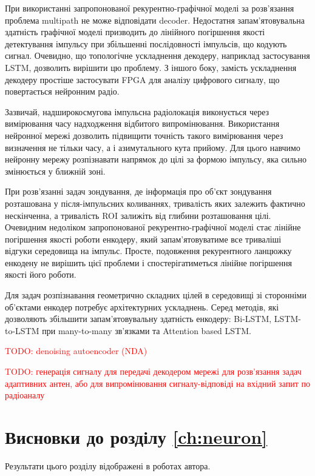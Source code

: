 При використанні запропонованої рекурентно-графічної моделі за розв'язання 
проблема multipath не може відповідати decoder. Недостатня запам'ятовувальна 
здатність графічної моделі призводить до лінійного погіршення якості 
детектування імпульсу при збільшенні послідовності імпульсів, що кодують 
сигнал. Очевидно, що топологічне ускладнення декодеру, наприклад застосування 
LSTM, дозволить вирішити цю проблему. З іншого боку, замість ускладнення 
декодеру простіше застосувати FPGA для аналізу цифрового сигналу, що 
повертається нейронним радіо.

Зазвичай, надширокосмугова імпульсна радіолокація виконується 
через вимірювання часу надходження відбитого випромінювання. Використання 
нейронної мережі дозволить підвищити точність такого вимірювання через 
визначення не тільки часу, а і азимутального кута прийому. Для цього навчимо 
нейронну мережу розпізнавати напрямок до цілі за формою імпульсу, яка сильно 
змінюється у ближній зоні.

При розв'язанні задач зондування, де інформація про об'єкт зондування 
розташована у після-імпульсних коливаннях, тривалість яких залежить фактично 
нескінченна, а тривалість ROI залижіть від глибини розташовання цілі. 
Очевидним недоліком запропонованої рекурентно-графічної моделі стає лінійне 
погіршення якості роботи енкодеру, який запам'ятовуватиме все триваліші
відгуки середовища на імпульс. Просте, подовження рекурентного ланцюжку 
енкодену не вирішить цієї проблеми і спостерігатиметься лінійне погіршення 
якості його роботи.

Для задач розпізнавання геометрично складних цілей в середовищі зі сторонніми
об'єктами енкодер потребує архітектурних ускладнень. Серед методів, які 
дозволяють збільшити запам'ятовувальну здатність енкодеру: Bi-LSTM, 
LSTM-to-LSTM при many-to-many зв'язками та Attention based LSTM.

\textcolor{red}{TODO: denoising autoencoder (NDA)}

\textcolor{red}{TODO: генерація сигналу для передачі декодером мережі для 
розв'язання задач адаптивних антен, або для випромінювання сигналу-відповіді 
на вхідний запит по радіоаналу}

\section*{Висновки до розділу \ref{ch:neuron}}

Результати цього розділу відображені в роботах автора.
